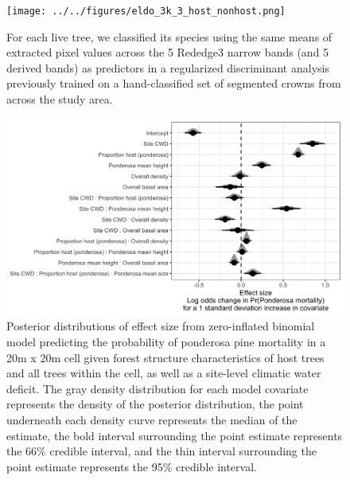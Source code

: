\documentclass[]{article}
\begin{document}
\begin{figure}
\centering
\texttt{[image: ../../figures/eldo\_3k\_3\_host\_nonhost.png]}
\caption{For each live tree, we classified its species using the same
means of extracted pixel values across the 5 Rededge3 narrow bands (and
5 derived bands) as predictors in a regularized discriminant analysis
previously trained on a hand-classified set of segmented crowns from
across the study area.}
\end{figure}

\begin{figure}
\centering
\includegraphics{../../figures/effect-sizes-halfeye.png}
\caption{Posterior distributions of effect size from zero-inflated
binomial model predicting the probability of ponderosa pine mortality in
a 20m x 20m cell given forest structure characteristics of host trees
and all trees within the cell, as well as a site-level climatic water
deficit. The gray density distribution for each model covariate
represents the density of the posterior distribution, the point
underneath each density curve represents the median of the estimate, the
bold interval surrounding the point estimate represents the 66\%
credible interval, and the thin interval surrounding the point estimate
represents the 95\% credible interval.}
\end{figure}
\end{document}
